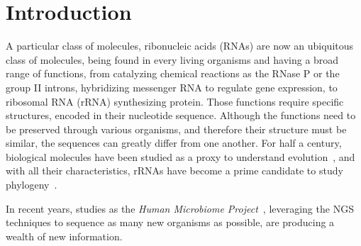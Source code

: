\section{Introduction}
\label{sec:introduction}

A particular class of molecules,
ribonucleic acids (RNAs) are  now  an ubiquitous class of molecules, being
found in every living organisms and having a broad range of functions, from catalyzing
chemical reactions as the RNase P or the group II introns,
hybridizing  messenger RNA to regulate gene expression,
to ribosomal RNA (rRNA) synthesizing protein.
Those functions  require specific structures, 
encoded in their nucleotide sequence. Although the functions
need to be preserved through various organisms, and therefore
their structure must be similar,  the sequences
can greatly differ from one another.
For half a century, biological molecules have been studied as a proxy to understand
evolution~\cite{Zuckerkandl1965}, and with all their characteristics, rRNAs have
become a prime candidate to study phylogeny~\cite{Olsen1986, Olsen1993}.

In recent years, studies as the \emph{Human Microbiome Project}~\cite{Turnbaugh2007}, 
leveraging the NGS techniques to sequence as many new organisms 
as possible, are producing a wealth of new information.

